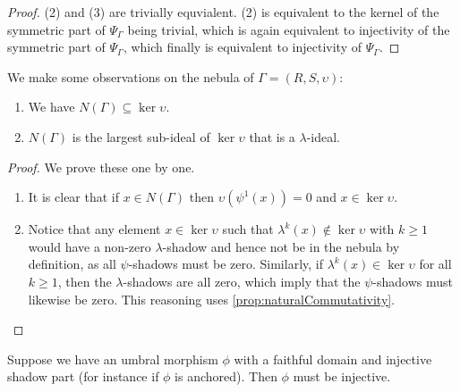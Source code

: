 \begin{proof}
  (2) and (3) are trivially equvialent. (2) is equivalent to the kernel of the symmetric part of $\Psi_\Gamma$ being trivial, which is again equivalent to injectivity of the symmetric part of $\Psi_\Gamma$, which finally is equivalent to injectivity of $\Psi_\Gamma$.
\end{proof}

\begin{proposition} 
  We make some observations on the nebula of $\Gamma = (R, S, \upsilon)$:
  \begin{enumerate}
    \item We have $N(\Gamma) \subseteq \ker \upsilon$. 
    \item $N(\Gamma)$ is the largest sub-ideal of $\ker \upsilon$ that is a $\lambda$-ideal. 
  \end{enumerate}
\end{proposition}

\begin{proof}
  We prove these one by one.
  \begin{enumerate}
    \item It is clear that if $x \in N(\Gamma)$ then $\upsilon(\psi^1(x)) = 0$ and $x \in \ker \upsilon$.
    \item Notice that any element $x \in \ker \upsilon$ such that $\lambda^k(x) \notin \ker \upsilon$ with $k \ge 1$ would have a non-zero $\lambda$-shadow and hence not be in the nebula by definition, as all $\psi$-shadows must be zero. Similarly, if $\lambda^k(x) \in \ker \upsilon$ for all $k \ge 1$, then the $\lambda$-shadows are all zero, which imply that the $\psi$-shadows must likewise be zero. This reasoning  uses \ref{prop:naturalCommutativity}.
  \end{enumerate}
\end{proof}

\begin{proposition}
  Suppose we have an umbral morphism $\phi$ with a faithful domain and injective shadow part (for instance if $\phi$ is anchored). Then $\phi$ must be injective. 
\end{proposition}

